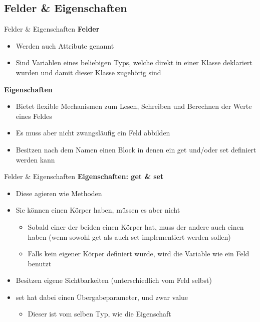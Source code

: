 \subsection{Felder \& Eigenschaften}
\begin{frame}{Felder \& Eigenschaften}
	\textbf{Felder}\\
	\begin{itemize}
		\item Werden auch Attribute genannt
		\item Sind Variablen eines beliebigen Typs, welche direkt in einer Klasse deklariert wurden und damit dieser Klasse zugehörig sind
	\end{itemize}
	\textbf{Eigenschaften}\\
	\begin{itemize}
		\item Bietet flexible Mechanismen zum Lesen, Schreiben und Berechnen der Werte eines Feldes
		\item Es muss aber nicht zwangsläufig ein Feld abbilden
		\item Besitzen nach dem Namen einen Block in denen ein \alert{get} und/oder \alert{set} definiert werden kann
	\end{itemize}
\end{frame}

\begin{frame}{Felder \& Eigenschaften}
	\textbf{Eigenschaften: get \& set}
	\begin{itemize}
		\item Diese agieren wie Methoden
		\item Sie können einen Körper haben, müssen es aber nicht
		\begin{itemize}
			\item Sobald einer der beiden einen Körper hat, muss der andere auch einen haben (wenn sowohl \alert{get} als auch \alert{set} implementiert werden sollen)
			\item Falls kein eigener Körper definiert wurde, wird die Variable wie ein Feld benutzt
		\end{itemize}
		\item Besitzen eigene Sichtbarkeiten (unterschiedlich vom Feld selbst)
		\item \alert{set} hat dabei einen Übergabeparameter, und zwar \alert{value}
		\begin{itemize}
			\item Dieser ist vom selben Typ, wie die Eigenschaft		
		\end{itemize}		
	\end{itemize}
\end{frame}

